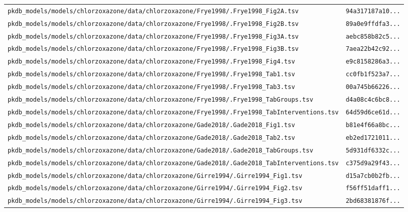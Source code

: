 \documentclass{article}
\begin{document}
\begin{longtable}{ll}
\texttt{pkdb\_models/models/chlorzoxazone/data/chlorzoxazone/Frye1998/.Frye1998\_Fig2A.tsv} & \texttt{94a317187a10...} \\
\texttt{pkdb\_models/models/chlorzoxazone/data/chlorzoxazone/Frye1998/.Frye1998\_Fig2B.tsv} & \texttt{89a0e9ffdfa3...} \\
\texttt{pkdb\_models/models/chlorzoxazone/data/chlorzoxazone/Frye1998/.Frye1998\_Fig3A.tsv} & \texttt{aebc858b82c5...} \\
\texttt{pkdb\_models/models/chlorzoxazone/data/chlorzoxazone/Frye1998/.Frye1998\_Fig3B.tsv} & \texttt{7aea22b42c92...} \\
\texttt{pkdb\_models/models/chlorzoxazone/data/chlorzoxazone/Frye1998/.Frye1998\_Fig4.tsv} & \texttt{e9c8158286a3...} \\
\texttt{pkdb\_models/models/chlorzoxazone/data/chlorzoxazone/Frye1998/.Frye1998\_Tab1.tsv} & \texttt{cc0fb1f523a7...} \\
\texttt{pkdb\_models/models/chlorzoxazone/data/chlorzoxazone/Frye1998/.Frye1998\_Tab3.tsv} & \texttt{00a745b66226...} \\
\texttt{pkdb\_models/models/chlorzoxazone/data/chlorzoxazone/Frye1998/.Frye1998\_TabGroups.tsv} & \texttt{d4a08c4c6bc8...} \\
\texttt{pkdb\_models/models/chlorzoxazone/data/chlorzoxazone/Frye1998/.Frye1998\_TabInterventions.tsv} & \texttt{64d59d6ce61d...} \\
\texttt{pkdb\_models/models/chlorzoxazone/data/chlorzoxazone/Gade2018/.Gade2018\_Fig1.tsv} & \texttt{b81e4f66a8bc...} \\
\texttt{pkdb\_models/models/chlorzoxazone/data/chlorzoxazone/Gade2018/.Gade2018\_Tab2.tsv} & \texttt{eb2ed1721011...} \\
\texttt{pkdb\_models/models/chlorzoxazone/data/chlorzoxazone/Gade2018/.Gade2018\_TabGroups.tsv} & \texttt{5d931df6332c...} \\
\texttt{pkdb\_models/models/chlorzoxazone/data/chlorzoxazone/Gade2018/.Gade2018\_TabInterventions.tsv} & \texttt{c375d9a29f43...} \\
\texttt{pkdb\_models/models/chlorzoxazone/data/chlorzoxazone/Girre1994/.Girre1994\_Fig1.tsv} & \texttt{d15a7cb0b2fb...} \\
\texttt{pkdb\_models/models/chlorzoxazone/data/chlorzoxazone/Girre1994/.Girre1994\_Fig2.tsv} & \texttt{f56ff51daff1...} \\
\texttt{pkdb\_models/models/chlorzoxazone/data/chlorzoxazone/Girre1994/.Girre1994\_Fig3.tsv} & \texttt{2bd68381876f...} \\

\end{longtable}
\end{document}
